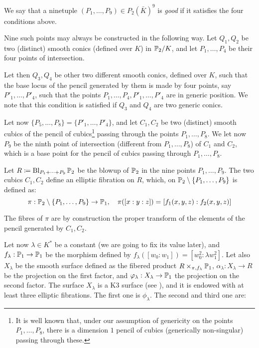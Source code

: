 \documentclass[a4paper,12pt]{article}
\begin{document}
\begin{definition}\label{good}
	We say that a ninetuple $(P_1,\dots, P_9) \in P_2(\bar{K})^9$ is \emph{good} if it satisfies the four conditions above.
\end{definition}

\begin{remark}
	Nine such points may always be constructed in the following way. Let $Q_1, Q_2$ be two (distinct) smooth conics (defined over $K$) in $\P_2/K$, and let $P_1,\dots, P_4$ be their four points of intersection.
	
	Let then $Q_3, Q_4$ be other two different smooth conics, defined over $K$, such that the base locus of the pencil generated by them is made by four points, say $P'_1,\dots, P'_4$, such that the points $P_1,\dots, P_4, P'_1,\dots, P'_4$ are in generic position. We note that this condition is satisfied if $Q_3$ and $Q_4$ are two generic conics.
	
	Let now $\{P_5,\dots, P_8\}=\{P'_1,\dots,P'_4\}$, and let $C_1, C_2$ be two (distinct) smooth cubics of the pencil of cubics\footnote{It is well known that, under our assumption of genericity on the points $P_1,\dots,P_8$, there is a dimension $1$ pencil of cubics (generically non-singular) passing through these.} passing through the points $P_1,\dots,P_8$. We let now $P_9$ be the ninth point of intersection (different from $P_1,\dots, P_8$) of $C_1$ and $C_2$, which is a base point for the pencil of cubics passing through $P_1,\dots, P_8$.
\end{remark}

Let $R\defeq \Blowup_{P_1+\dots+P_9}\P_2$ be the blowup of $\P_2$ in the nine points $P_1,\dots,P_9$. The two cubics $C_1,C_2$ define an elliptic fibration on $R$, which, on $\P_2 \setminus \{P_1,\dots, P_9\}$ is defined as:
\begin{equation}\label{lafibrazioneellittica}
	\pi:\P_2 \setminus \{P_1,\dots, P_9\} \rightarrow \P_1, \quad
	\pi([x:y:z])=[f_1(x,y,z):f_2(x,y,z)]
\end{equation}

The fibres of $\pi$ are by construction the proper transform of the elements of the pencil generated by $C_1, C_2$. 

Let now $\lambda \in K^*$ be a constant (we are going to fix its value later), and $f_{\lambda}:\P_1 \rightarrow \P_1$ be the morphism defined by $f_{\lambda}([w_0:w_1])=[w_0^2:\lambda w_1^2]$. Let also $X_{\lambda}$ be the smooth surface defined as the fibered product $R \times_{\pi,f_{\lambda}} \P_1$, $\alpha_{\lambda}:X_{\lambda}\rightarrow R$ be the projection on the first factor, and $\phi_{\lambda}:X_{\lambda}\rightarrow \P_1$ the projection on the second factor. The surface $X_{\lambda}$ is a K3 surface (see \cite[...]{garbagnati}), and it is endowed with at least three elliptic fibrations. The first one is $\phi_{\lambda}$. The second and third one are:
\end{document}

